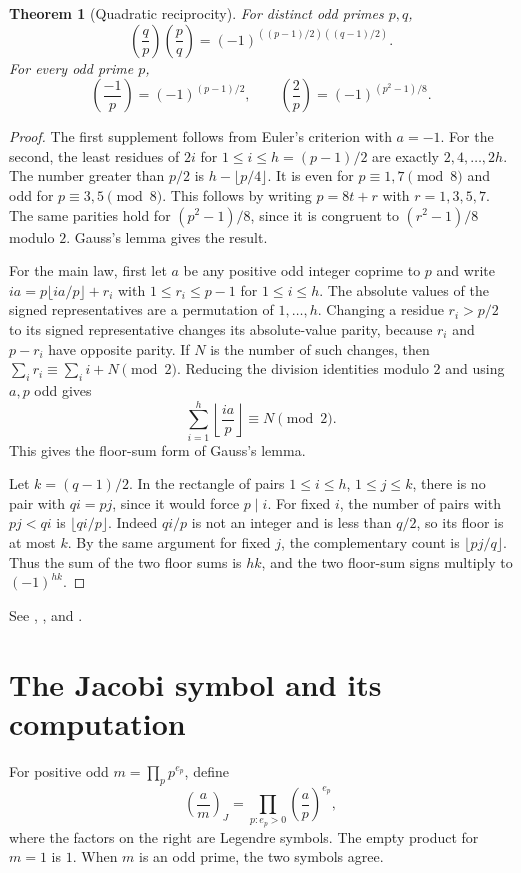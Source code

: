 \documentclass[11pt,oneside,openany]{book}
\theoremstyle{plain}
\newtheorem{theorem}{Theorem}[chapter]
\theoremstyle{definition}
\theoremstyle{remark}
\begin{document}
\begin{theorem}[Quadratic reciprocity]\label{nt:B07}
For distinct odd primes $p,q$,
\[
 \left(\frac qp\right)\left(\frac pq\right)
   =(-1)^{((p-1)/2)((q-1)/2)}.
\]
For every odd prime $p$,
\[
 \left(\frac{-1}p\right)=(-1)^{(p-1)/2},\qquad
 \left(\frac 2p\right)=(-1)^{(p^2-1)/8}.
\]
\end{theorem}
\begin{proof}
The first supplement follows from Euler's criterion with $a=-1$.
For the second, the least residues of $2i$ for
$1\le i\le h=(p-1)/2$ are exactly $2,4,\ldots,2h$.
The number greater than $p/2$ is $h-\lfloor p/4\rfloor$.
It is even for $p\equiv1,7\pmod8$ and odd for
$p\equiv3,5\pmod8$. This follows by writing $p=8t+r$ with
$r=1,3,5,7$. The same parities hold for $(p^2-1)/8$, since
it is congruent to $(r^2-1)/8$ modulo $2$. Gauss's lemma gives
the result.

For the main law, first let $a$ be any positive odd integer
coprime to $p$ and write
$ia=p\lfloor ia/p\rfloor+r_i$ with $1\le r_i\le p-1$ for
$1\le i\le h$. The absolute values of the signed representatives
are a permutation of $1,\ldots,h$. Changing a residue
$r_i>p/2$ to its signed representative changes its absolute-value
parity, because $r_i$ and $p-r_i$ have opposite parity.
If $N$ is the number of such changes, then
$\sum_i r_i\equiv\sum_i i+N\pmod2$. Reducing the division
identities modulo $2$ and using $a,p$ odd gives
\[
 \sum_{i=1}^h\left\lfloor\frac{ia}{p}\right\rfloor\equiv N\pmod2.
\]
This gives the floor-sum form of Gauss's lemma.

Let $k=(q-1)/2$. In the rectangle of pairs
$1\le i\le h$, $1\le j\le k$, there is no pair with $q i=p j$,
since it would force $p\mid i$. For fixed $i$, the number
of pairs with $p j<q i$ is $\lfloor qi/p\rfloor$. Indeed
$qi/p$ is not an integer and is less than $q/2$, so its
floor is at most $k$. By the same argument for fixed $j$,
the complementary count is $\lfloor pj/q\rfloor$.
Thus the sum of the two floor sums is $hk$, and the two
floor-sum signs multiply to $(-1)^{hk}$.
\end{proof}
See \cite[\S\S9.3--9.5]{apostol}, \cite[\S\S3.1--3.2]{nzm},
and \cite[Ch.~12]{shoup}.

\section{The Jacobi symbol and its computation}

For positive odd $m=\prod_p p^{e_p}$, define
\[
 \left(\frac am\right)_{\!J}
   =\prod_{p:e_p>0}\left(\frac ap\right)^{e_p},
\]
where the factors on the right are Legendre symbols. The empty
product for $m=1$ is $1$. When $m$ is an odd prime, the two
symbols agree.
\end{document}
